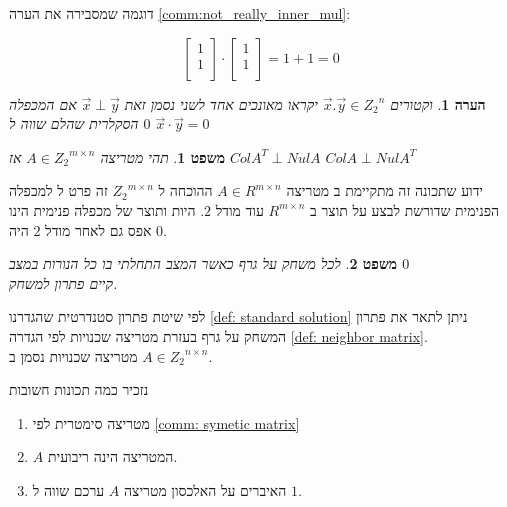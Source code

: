 \documentclass[12pt,leqno]{article}
\newtheorem{theorem}{משפט}[section]
\newtheorem{comm}{הערה}[section]
\newcommand{\Zn}{{Z_2}^n}
\begin{document}
דוגמה 
שמסבירה את הערה
\ref{comm:not_really_inner_mul}:

\[
    \begin{bmatrix}
    1 \\
    1 \\
    \end{bmatrix}    
    \cdot 
    \begin{bmatrix}
    1 \\
    1 \\
    \end{bmatrix} 
    = 1 + 1 = 0
\]

\begin{comm}
    וקטורים 
    $\vec{x}. \vec{y} \in \Zn $
    יקראו מאונכים אחד לשני נסמן זאת 
    $\vec{x} \perp  \vec{y}$
    אם המכפלה הסקלרית שהלם שווה 
    ל
    $0$
    $\vec{x} \cdot \vec{y} = 0$
\end{comm}

\begin{theorem}
    \label{the: Nul A and Col AT}
    תהי מטריצה 
    $A \in {Z_2}^{m \times n }$
    אז 
    $ColA^T \perp Nul A$
    $ColA \perp Nul A^T$
\end{theorem}

ידוע שתכונה זה מתקיימת 
ב
מטריצה 
$A \in R^{m \times n}$
ההוכחה 
ל
$ {Z_2}^{m \times n}$
זה
פרט ל
למכפלה הפנימית 
שדורשת 
לבצע על תוצר 
ב
$R^{m \times n}$
עוד 
מודל 
$2$.
היות ותוצר של מכפלה פנימית הינו אפס גם לאחר מודל 
$2$
היה 
$0$.

\begin{theorem}
    \label{thrm: clean game has solution}
    לכל משחק על גרף כאשר המצב התחלתי בו כל הנורות במצב 
    $0$
    \\
    קיים פתרון למשחק.
\end{theorem}

לפי 
שיטת פתרון סטנדרטית 
שהגדרנו
\ref{def: standard solution}
ניתן לתאר את פתרון המשחק על גרף בעזרת מטריצה
שכנויות לפי הגדרה 
\ref{def: neighbor matrix}.
\\
מטריצה שכנויות
נסמן ב
$A \in {Z_2}^{n \times n}$.

נזכיר כמה תכונות חשובות
\begin{enumerate}
    \item 
    מטריצה סימטרית לפי
    \ref{comm: symetic matrix}
    \item 
    $A$
    המטריצה הינה ריבועית.
    \item 
    האיברים על האלכסון
    מטריצה 
    $A$
    ערכם שווה ל
    $1$.
\end{enumerate}
\end{document}
